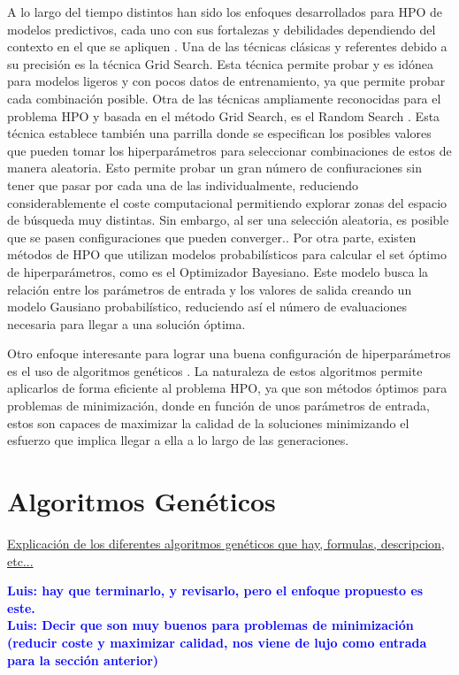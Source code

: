 \documentclass{uathesis-es}
\begin{document}
A lo largo del tiempo distintos han sido los enfoques desarrollados para HPO de modelos predictivos, cada uno con sus fortalezas y debilidades dependiendo del contexto en el que se apliquen \cite{bischl2023hyperparameter}. Una de las técnicas clásicas y referentes debido a su precisión es la técnica Grid Search. Esta técnica permite probar y es idónea para modelos ligeros y con pocos datos de entrenamiento, ya que permite probar cada combinación posible. Otra de las técnicas ampliamente reconocidas para el problema HPO y basada en el método Grid Search, es el Random Search \cite{bergstra2012random}. Esta técnica establece también una parrilla donde se especifican los posibles valores que pueden tomar los hiperparámetros para seleccionar combinaciones de estos de manera aleatoria. Esto permite probar un gran número de confiuraciones sin tener que pasar por cada una de las individualmente, reduciendo considerablemente el coste computacional permitiendo explorar zonas del espacio de búsqueda muy distintas. Sin embargo, al ser una selección aleatoria, es posible que se pasen configuraciones que pueden converger.. Por otra parte, existen métodos de HPO que utilizan modelos probabilísticos para calcular el set óptimo de hiperparámetros, como es el Optimizador Bayesiano. Este modelo busca la relación entre los parámetros de entrada y los valores de salida creando un modelo Gausiano probabilístico, reduciendo así el número de evaluaciones necesaria para llegar a una solución óptima.

Otro enfoque interesante para lograr una buena configuración de hiperparámetros es el uso de algoritmos genéticos \cite{alibrahim2021hyperparameter}. La naturaleza de estos algoritmos permite aplicarlos de forma eficiente al problema HPO, ya que son métodos óptimos para problemas de minimización, donde en función de unos parámetros de entrada, estos son capaces de maximizar la calidad de la soluciones minimizando el esfuerzo que implica llegar a ella a lo largo de las generaciones.

\section{Algoritmos Genéticos}
\underline{Explicación de los diferentes algoritmos genéticos que hay, formulas, descripcion, etc...}

\textcolor{blue}{\textbf{Luis: hay que terminarlo, y revisarlo, pero el enfoque propuesto es este.}}\\

\textcolor{blue}{\textbf{Luis: Decir que son muy buenos para problemas de minimización (reducir coste y maximizar calidad, nos viene de lujo como entrada para la sección anterior)}}\\
\end{document}
